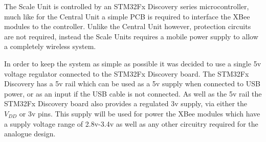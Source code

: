 The Scale Unit is controlled by an STM32Fx Discovery series microcontroller, much like for the Central Unit a simple PCB is required to interface the XBee modules to the controller.  Unlike the Central Unit however, protection circuits are not required, instead the Scale Units requires a mobile power supply to allow a completely wireless system.

In order to keep the system as simple as possible it was decided to use a single 5v voltage regulator connected to the STM32Fx Discovery board. The STM32Fx Discovery has a 5v rail which can be used as a 5v supply when connected to USB power, or as an input if the USB cable is not connected. As well as the 5v rail the STM32Fx Discovery board also provides a regulated 3v supply, via either the $V_{DD}$ or 3v pins. This supply will be used for power the XBee modules which have a supply voltage range of 2.8v-3.4v as well as any other circuitry required for the analogue design.
